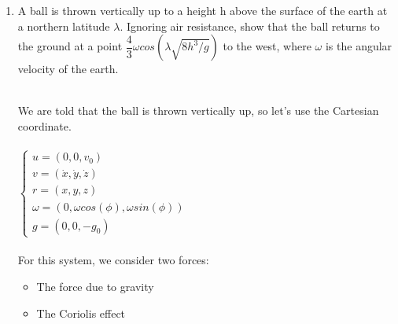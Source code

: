 \documentclass[fleqn]{article}
\begin{document}
\begin{enumerate}
    \pagebreak

    \item A ball is thrown vertically up to a height h above the surface of the earth at a northern latitude $\lambda$. Ignoring air resistance, show that the
    ball returns to the ground at a point $\dfrac{4}{3} \omega cos(\lambda \sqrt{8h^3/g})$ to the west, where $\omega$ is the angular velocity of the earth.

      \textcolor{hwColor}{
        \\
        We are told that the ball is thrown vertically up, so let's use the Cartesian coordinate. \\
        \\
        $
          \begin{cases}
            u=(0,0,v_0)
            \\
            v=(\dot{x}, \dot{y}, \dot{z})
            \\
            r=(x,y,z)
            \\
            \omega=(0, \omega cos(\phi), \omega sin(\phi))
            \\
            g=(0, 0, -g_0)
          \end{cases}
        $
        \\
        \\
        For this system, we consider two forces:
        \begin{itemize}
          \item The force due to gravity
          \item The Coriolis effect
        \end{itemize}
      }


\end{enumerate}
\end{document}
